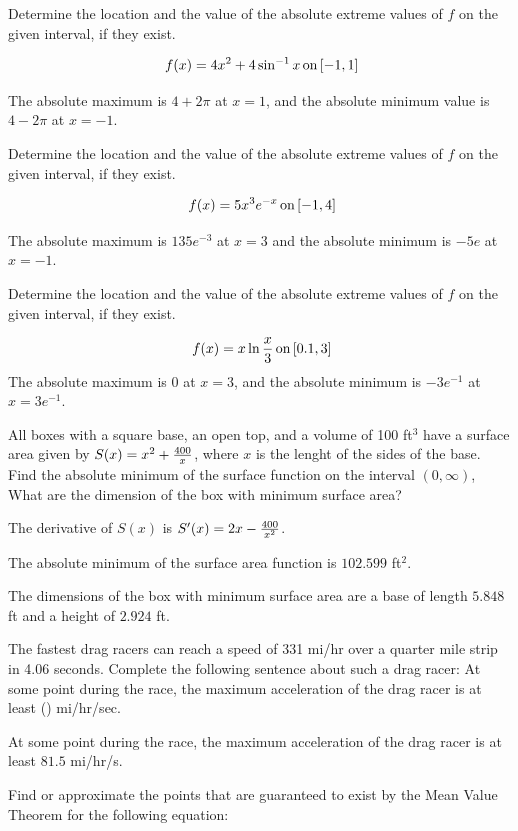 Determine the location and the value of the absolute extreme
values of $f$ on the given interval, if they exist.

$$\
f(x) = 4x^2 + 4\sin^{-1}x \, \hbox{on} \, [-1, 1]
$$

The absolute maximum is $4 + 2\pi$ at $x = 1$, and the
absolute minimum value is $4 - 2\pi$ at $x = -1$.

Determine the location and the value of the absolute extreme
values of $f$ on the given interval, if they exist.

$$\
f(x) = 5x^3e^{-x} \, \hbox{on} \, [-1, 4]
$$

The absolute maximum is $135e^{-3}$ at $x=3$ and the absolute
minimum is $-5e$ at $x=-1$.

Determine the location and the value of the absolute extreme
values of $f$ on the given interval, if they exist.

$$\
f(x) = x\ln{x \over 3} \, \hbox{on} \, [0.1, 3]
$$
The absolute maximum is $0$ at $x = 3$, and the absolute
minimum is $-3e^{-1}$ at $x = 3e^{-1}$.

\problem{4.1.69}

All boxes with a square base, an open top, and a volume of
100 ft$^3$ have a surface area given by $S(x) = x^2 + {400 \over x}$,
where $x$ is the lenght of the sides of the base. Find the
absolute minimum of the surface function on the interval
$(0, \infty)$, What are the dimension of the box with minimum surface
area?
\solution{4.1.72}
\par The derivative of $S(x)$ is $S'(x) = 2x - {400 \over x^2}$.
\par The absolute minimum of the surface area function is $102.599$ ft$^2$.
\par The dimensions of the box with minimum surface area are a base
of length $5.848$ ft and a height of $2.924$ ft.

\problem{4.2.20}
The fastest drag racers can reach a speed of 331 mi/hr over
a quarter mile strip in 4.06 seconds. Complete the following
sentence about such a drag racer: At some point during the
race, the maximum acceleration of the drag racer is at least () mi/hr/sec.

\solution{4.2.20}
At some point during the race, the maximum acceleration of
the drag racer is at least $81.5$ mi/hr/s.

\problem{4.2.26}
Find or approximate the points that are guaranteed to exist
by the Mean Value Theorem for the following equation:

